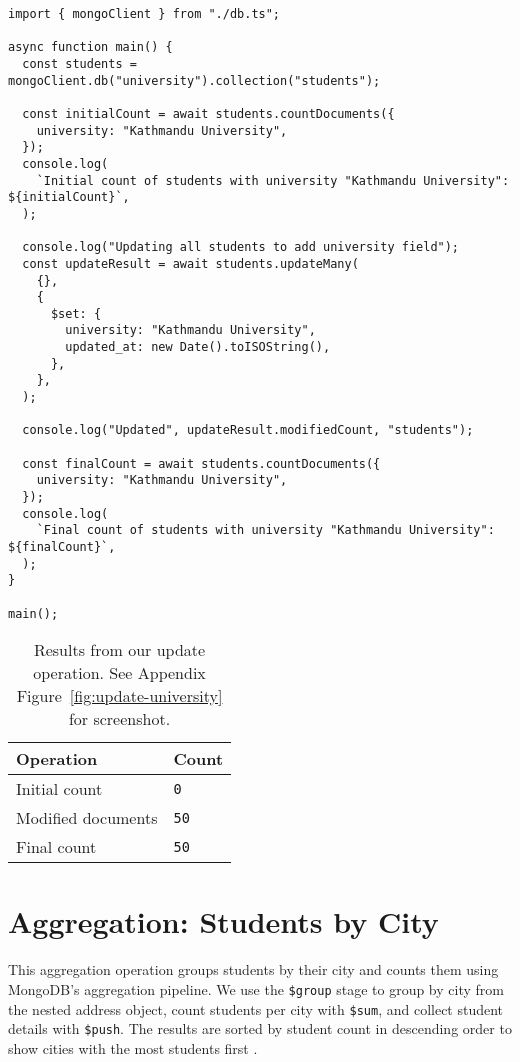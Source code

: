 \begin{verbatim}
import { mongoClient } from "./db.ts";

async function main() {
  const students = mongoClient.db("university").collection("students");

  const initialCount = await students.countDocuments({
    university: "Kathmandu University",
  });
  console.log(
    `Initial count of students with university "Kathmandu University": ${initialCount}`,
  );

  console.log("Updating all students to add university field");
  const updateResult = await students.updateMany(
    {},
    {
      $set: {
        university: "Kathmandu University",
        updated_at: new Date().toISOString(),
      },
    },
  );

  console.log("Updated", updateResult.modifiedCount, "students");

  const finalCount = await students.countDocuments({
    university: "Kathmandu University",
  });
  console.log(
    `Final count of students with university "Kathmandu University": ${finalCount}`,
  );
}

main();
\end{verbatim}

\begin{table}[H]
  \centering
  \begin{tabular}{|l|l|}
    \hline
    \textbf{Operation} & \textbf{Count} \\
    \hline
    Initial count      & \texttt{0}              \\
    Modified documents & \texttt{50}             \\
    Final count        & \texttt{50}             \\
    \hline
  \end{tabular}
  \caption{Results from our update operation. See Appendix Figure~\ref{fig:update-university} for screenshot.}
\end{table}

\section{Aggregation: Students by City}
This aggregation operation groups students by their city and counts them using MongoDB's aggregation pipeline. We use the \texttt{\$group} stage to group by city from the nested address object, count students per city with \texttt{\$sum}, and collect student details with \texttt{\$push}. The results are sorted by student count in descending order to show cities with the most students first \parencite{mongodb_architecture}.

